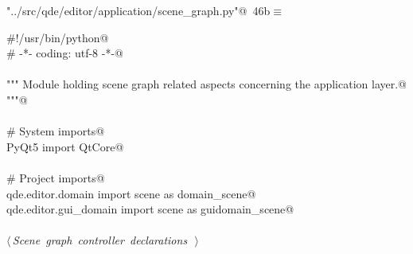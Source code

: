 \documentclass[
    a4paper,      %
    10pt,         %
    openright,    %
    notitlepage,  %
    parskip=half, %
]{scrreprt}       %
\theoremstyle{definition}                    %
\begin{document}
\begin{flushleft} \small
\begin{minipage}{\linewidth}\label{scrap55}\raggedright\small
{} \verb@"../src/qde/editor/application/scene_graph.py"@\nobreak\ {\footnotesize {46b}}$\equiv$
\vspace{-1ex}
\begin{list}{}{} \item
\mbox{}\lstinline@#!/usr/bin/python@\\
\mbox{}\lstinline@# -*- coding: utf-8 -*-@\\
\mbox{}\lstinline@@\\
\mbox{}\lstinline@""" Module holding scene graph related aspects concerning the application layer.@\\
\mbox{}\lstinline@"""@\\
\mbox{}\lstinline@@\\
\mbox{}\lstinline@# System imports@\\
\mbox{}\lstinline@from PyQt5 import QtCore@\\
\mbox{}\lstinline@@\\
\mbox{}\lstinline@# Project imports@\\
\mbox{}\lstinline@from qde.editor.domain     import scene as domain_scene@\\
\mbox{}\lstinline@from qde.editor.gui_domain import scene as guidomain_scene@\\
\mbox{}\lstinline@@\\
\mbox{}\lstinline@@\hbox{$\langle\,${\itshape Scene graph controller declarations}\nobreak\ {\footnotesize {}}$\,\rangle$}\lstinline@@\\
\mbox{}\lstinline@@{\NWsep}
\end{list}
\vspace{-1.5ex}
\footnotesize
\begin{list}{}{\setlength{\itemsep}{-\parsep}\setlength{\itemindent}{-\leftmargin}}

\item{}
\end{list}
\end{minipage}\vspace{4ex}
\end{flushleft}
\end{document}
